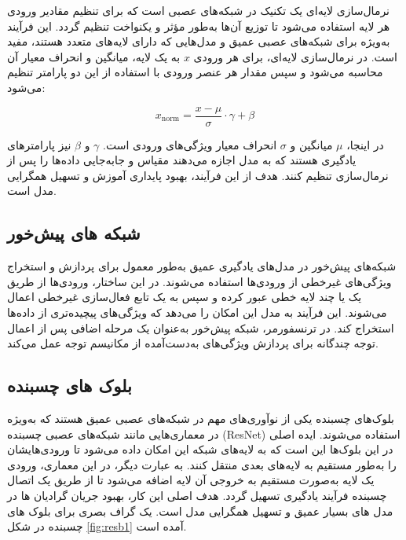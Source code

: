 نرمال‌سازی لایه‌ای%
یک تکنیک در شبکه‌های عصبی است که برای تنظیم مقادیر ورودی هر لایه استفاده می‌شود تا توزیع آن‌ها به‌طور مؤثر و یکنواخت تنظیم گردد. این فرآیند به‌ویژه برای شبکه‌های عصبی عمیق و مدل‌هایی که دارای لایه‌های متعدد هستند، مفید است. در نرمال‌سازی لایه‌ای، برای هر ورودی $x$ به یک لایه، میانگین و انحراف معیار آن محاسبه می‌شود و سپس مقدار هر عنصر ورودی با استفاده از این دو پارامتر تنظیم می‌شود:

\[
x_{\text{norm}} = \frac{x - \mu}{\sigma} \cdot \gamma + \beta
\]

در اینجا، $\mu$ میانگین و $\sigma$ انحراف معیار ویژگی‌های ورودی است. $\gamma$ و $\beta$ نیز پارامترهای یادگیری هستند که به مدل اجازه می‌دهند مقیاس و جابه‌جایی داده‌ها را پس از نرمال‌سازی تنظیم کنند. هدف از این فرآیند، بهبود پایداری آموزش و تسهیل همگرایی مدل است.

\subsection{شبکه های پیش‌خور}

شبکه‌های پیش‌خور%
در مدل‌های یادگیری عمیق به‌طور معمول برای پردازش و استخراج ویژگی‌های غیرخطی از ورودی‌ها استفاده می‌شوند. در این ساختار، ورودی‌ها از طریق یک یا چند لایه خطی عبور کرده و سپس به یک تابع فعال‌سازی غیرخطی اعمال می‌شوند. این فرآیند به مدل این امکان را می‌دهد که ویژگی‌های پیچیده‌تری از داده‌ها استخراج کند. در ترنسفورمر، شبکه پیش‌خور به‌عنوان یک مرحله اضافی پس از اعمال توجه چندگانه برای پردازش ویژگی‌های به‌دست‌آمده از مکانیسم توجه عمل می‌کند.

\subsection{بلوک های چسبنده}
بلوک‌های چسبنده%
\cite{heDeepResidualLearning2015}
یکی از نوآوری‌های مهم در شبکه‌های عصبی عمیق هستند که به‌ویژه در معماری‌هایی مانند شبکه‌های عصبی چسبنده (ResNet) استفاده می‌شوند. ایده اصلی در این بلوک‌ها این است که به لایه‌های شبکه این امکان داده می‌شود تا ورودی‌هایشان را به‌طور مستقیم به لایه‌های بعدی منتقل کنند. به عبارت دیگر، در این معماری، ورودی یک لایه به‌صورت مستقیم به خروجی آن لایه اضافه می‌شود تا از طریق یک اتصال چسبنده فرآیند یادگیری تسهیل گردد. هدف اصلی این کار، بهبود جریان گرادیان ها در مدل های بسیار عمیق و تسهیل همگرایی مدل است. یک گراف بصری برای بلوک های چسبنده در شکل
\ref{fig:resb1}
آمده است.

